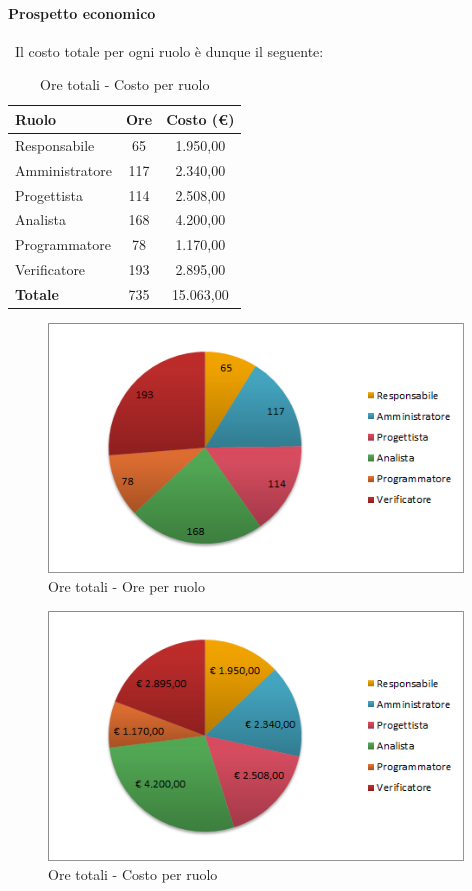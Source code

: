 \documentclass[../PianoDiProgetto.tex]{subfiles}
\begin{document}
\newpage	
	
	\paragraph{Prospetto economico}\
					Il costo totale per ogni ruolo è dunque il seguente:
	\begin{table}[H]
		\centering
		\begin{tabular}{l * {2}{c}}
			\toprule
			\textbf{Ruolo} & \textbf{Ore} & \textbf{Costo (\euro{})} \\
			\midrule
			Responsabile & 65    &  1.950,00 \\
			Amministratore  & 117   &  2.340,00 \\
			Progettista  & 114   &  2.508,00 \\
			Analista & 168   &  4.200,00 \\
			Programmatore  & 78   &  1.170,00 \\
			Verificatore  & 193   &  2.895,00 \\
			\midrule
			\textbf{Totale}  & 735  &  15.063,00 \\
			\bottomrule
			
		\end{tabular}
		\caption{Ore totali - Costo per ruolo}
	\end{table}

\vspace{35 mm}	
	
	\begin{figure}[H]
		\centering
		\includegraphics[width=11cm, trim=1cm 0cm 1cm 0cm]{grafici/TOT-ruolo}
			\caption{Ore totali - Ore per ruolo}
	\end{figure}	
	
\newpage	
	
\vfill
	\begin{figure}[H]
		\centering
		\includegraphics[width=11cm, trim=1cm 0cm 1cm 0cm]{grafici/TOT-costo}
			\caption{Ore totali - Costo per ruolo}
	\end{figure}
\vfill
\newpage		
\end{document}
